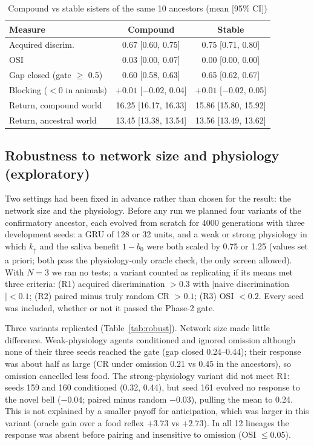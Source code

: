 \documentclass[conference]{IEEEtran}
\begin{document}
\begin{table}[t]
\centering
\caption{Compound vs stable sisters of the same 10 ancestors (mean [95\% CI])}
\label{tab:comp}
\footnotesize
\setlength{\tabcolsep}{3pt}
\begin{tabular}{@{}lcc@{}}
\toprule
Measure & Compound & Stable \\
\midrule
Acquired discrim. & 0.67 [0.60, 0.75] & 0.75 [0.71, 0.80] \\
OSI & 0.03 [0.00, 0.07] & 0.00 [0.00, 0.00] \\
Gap closed (gate $\geq$ 0.5) & 0.60 [0.58, 0.63] & 0.65 [0.62, 0.67] \\
Blocking ($<0$ in animals) & $+0.01$ [$-0.02$, 0.04] & $+0.01$ [$-0.02$, 0.05] \\
Return, compound world & 16.25 [16.17, 16.33] & 15.86 [15.80, 15.92] \\
Return, ancestral world & 13.45 [13.38, 13.54] & 13.56 [13.49, 13.62] \\
\bottomrule
\end{tabular}
\end{table}

\subsection{Robustness to network size and physiology (exploratory)}
Two settings had been fixed in advance rather than chosen for the result: the network size and the physiology. Before any run we planned four variants of the confirmatory ancestor, each evolved from scratch for 4000 generations with three development seeds: a GRU of 128 or 32 units, and a weak or strong physiology in which $k_{\uparrow}$ and the saliva benefit $1-b_0$ were both scaled by 0.75 or 1.25 (values set a priori; both pass the physiology-only oracle check, the only screen allowed). With $N=3$ we ran no tests; a variant counted as replicating if its means met three criteria: (R1) acquired discrimination $>0.3$ with $|$naive discrimination$|<0.1$; (R2) paired minus truly random CR $>0.1$; (R3) OSI $<0.2$. Every seed was included, whether or not it passed the Phase-2 gate.

Three variants replicated (Table~\ref{tab:robust}). Network size made little difference. Weak-physiology agents conditioned and ignored omission although none of their three seeds reached the gate (gap closed 0.24--0.44); their response was about half as large (CR under omission 0.21 vs 0.45 in the ancestors), so omission cancelled less food. The strong-physiology variant did not meet R1: seeds 159 and 160 conditioned (0.32, 0.44), but seed 161 evolved no response to the novel bell ($-0.04$; paired minus random $-0.03$), pulling the mean to 0.24. This is not explained by a smaller payoff for anticipation, which was larger in this variant (oracle gain over a food reflex $+3.73$ vs $+2.73$). In all 12 lineages the response was absent before pairing and insensitive to omission (OSI $\leq 0.05$).
\end{document}
